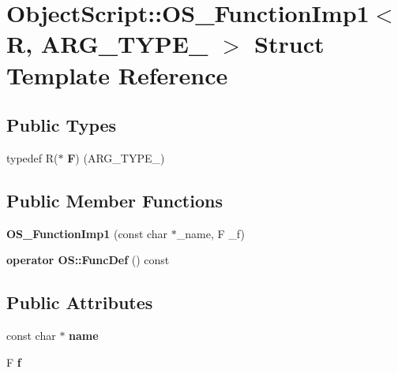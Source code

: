 \hypertarget{struct_object_script_1_1_o_s___function_imp1}{}\section{Object\+Script\+:\+:O\+S\+\_\+\+Function\+Imp1$<$ R, A\+R\+G\+\_\+\+T\+Y\+P\+E\+\_ $>$ Struct Template Reference}
\label{struct_object_script_1_1_o_s___function_imp1}
\subsection*{Public Types}
\begin{DoxyCompactItemize}
\item 
typedef R($\ast$ {\bfseries F}) (A\+R\+G\+\_\+\+T\+Y\+P\+E\+\_)\hypertarget{struct_object_script_1_1_o_s___function_imp1_ad898135344029eef0823011ec136e6f0}{}\label{struct_object_script_1_1_o_s___function_imp1_ad898135344029eef0823011ec136e6f0}

\end{DoxyCompactItemize}
\subsection*{Public Member Functions}
\begin{DoxyCompactItemize}
\item 
{\bfseries O\+S\+\_\+\+Function\+Imp1} (const char $\ast$\+\_\+name, F \+\_\+f)\hypertarget{struct_object_script_1_1_o_s___function_imp1_af7eb9cd450f0d5ba09b0a1db2fbe7847}{}\label{struct_object_script_1_1_o_s___function_imp1_af7eb9cd450f0d5ba09b0a1db2fbe7847}

\item 
{\bfseries operator O\+S\+::\+Func\+Def} () const \hypertarget{struct_object_script_1_1_o_s___function_imp1_a5c8f3645b3230f459097914f57707d52}{}\label{struct_object_script_1_1_o_s___function_imp1_a5c8f3645b3230f459097914f57707d52}

\end{DoxyCompactItemize}
\subsection*{Public Attributes}
\begin{DoxyCompactItemize}
\item 
const char $\ast$ {\bfseries name}\hypertarget{struct_object_script_1_1_o_s___function_imp1_a82069ce5b574ed9ae71963c5d30ea124}{}\label{struct_object_script_1_1_o_s___function_imp1_a82069ce5b574ed9ae71963c5d30ea124}

\item 
F {\bfseries f}\hypertarget{struct_object_script_1_1_o_s___function_imp1_ab1a155c14087c6d45b917d11de7403be}{}\label{struct_object_script_1_1_o_s___function_imp1_ab1a155c14087c6d45b917d11de7403be}

\end{DoxyCompactItemize}


